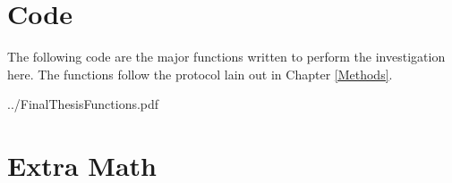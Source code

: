 \chapter{Code}
\label{AppendixA}
The following code are the major functions written to perform the investigation here.  The functions follow the protocol lain out in Chapter \ref{Methods}.  



    {../FinalThesisFunctions.pdf}
    
\chapter{Extra Math} \label{AppendixB}

